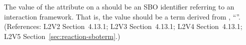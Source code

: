The value of the  attribute on a \Reaction should
be an SBO identifier referring to an interaction framework.  That
is, the value should be a term derived from \sbointeractionID,
``''.  (References: L2V2 Section~4.13.1; L2V3
Section~4.13.1; L2V4 Section~4.13.1; L2V5 Section~\ref{sec:reaction-sboterm}.)

